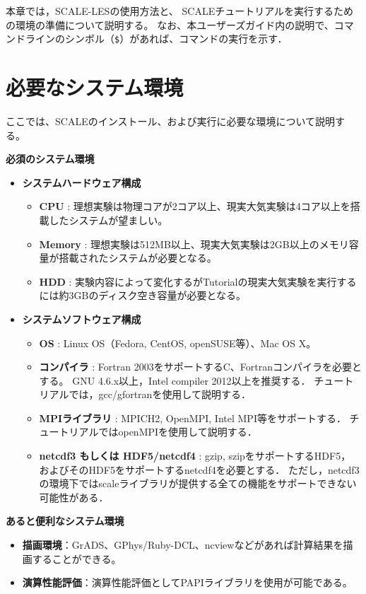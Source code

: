 本章では，SCALE-LESの使用方法と、
SCALEチュートリアルを実行するための環境の準備について説明する。
なお、本ユーザーズガイド内の説明で、コマンドラインのシンボル（\verb|$|）があれば、コマンドの実行を示す．

\section{必要なシステム環境}
\label{sec:req_env}
ここでは、SCALEのインストール、および実行に必要な環境について説明する。

{\bf 必須のシステム環境}
\begin{itemize}
  \item {\bf システムハードウェア構成}
  \begin{itemize}
    \item {\bf CPU} : 理想実験は物理コアが2コア以上、現実大気実験は4コア以上を搭載したシステムが望ましい。
    \item {\bf Memory} : 理想実験は512MB以上、現実大気実験は2GB以上のメモリ容量が搭載されたシステムが必要となる。
    \item {\bf HDD} : 実験内容によって変化するがTutorialの現実大気実験を実行するには約3GBのディスク空き容量が必要となる。
  \end{itemize}

  \item {\bf システムソフトウェア構成}
  \begin{itemize}
  \item {\bf OS} : Linux OS（Fedora, CentOS, openSUSE等）、Mac OS X。
  \item {\bf コンパイラ} : Fortran 2003をサポートするC、Fortranコンパイラを必要とする。
        GNU 4.6.x以上，Intel compiler 2012以上を推奨する．
        チュートリアルでは，gcc/gfortranを使用して説明する．
  \item {\bf MPIライブラリ} : MPICH2, OpenMPI, Intel MPI等をサポートする．
        チュートリアルではopenMPIを使用して説明する．
  \item {\bf netcdf3 もしくは HDF5/netcdf4} : gzip, szipをサポートするHDF5，
        およびそのHDF5をサポートするnetcdf4を必要とする．
        ただし，netcdf3の環境下ではscaleライブラリが提供する全ての機能をサポートできない可能性がある．
  \end{itemize}
\end{itemize}


{\bf あると便利なシステム環境}
\begin{itemize}
  \item {\bf 描画環境}：GrADS、GPhys/Ruby-DCL、ncviewなどがあれば計算結果を描画することができる。
  \item {\bf 演算性能評価}：演算性能評価としてPAPIライブラリを使用が可能である。
\end{itemize}


